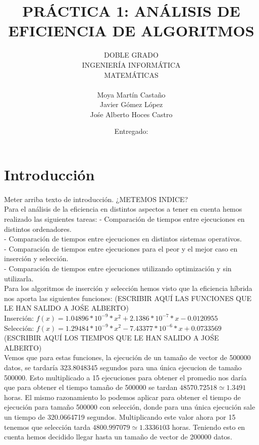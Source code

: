 \documentclass[10pt,a4paper]{article}
\author{DOBLE GRADO\\INGENIERÍA INFORMÁTICA\\MATEMÁTICAS\\\\Moya Martín Castaño\\Javier Gómez López\\Jośe Alberto Hoces Castro}
\title{PRÁCTICA 1: ANÁLISIS DE EFICIENCIA DE ALGORITMOS\\}
\date{Entregado: \newpage }
\begin{document}
\maketitle
\section*{Introducción}

\paragraph{}
Meter arriba texto de introducción.
¿METEMOS INDICE?
\\
Para el análisis de la eficiencia en distintos aspectos a tener en cuenta hemos realizado las siguientes tareas:
	- Comparación de tiempos entre ejecuciones en distintos ordenadores. \\
	- Comparación de tiempos entre ejecuciones en distintos sistemas operativos. \\
	- Comparación de tiempos entre ejecuciones para el peor y el mejor caso en  inserción y selección. \\
	- Comparación de tiempos entre ejecuciones utilizando optimización y sin utilizarla. \\

Para los algoritmos de inserción y selección hemos visto que la eficiencia híbrida nos aporta las siguientes funciones:
(ESCRIBIR AQUÍ LAS FUNCIONES QUE LE HAN SALIDO A JOŚE ALBERTO)
\\
Inserción: $f(x) =  1.04896 * 10^{-9} * x^2 + 2.1386 * 10^{-7} * x - 0.0120955 $
\\
Selección: $f(x) =  1.29484 * 10^{-9} * x^2 - 7.43377 * 10^{-6} * x + 0.0733569 $
\\
(ESCRIBIR AQUÍ LOS TIEMPOS QUE LE HAN SALIDO A JOŚE ALBERTO)
\\
Vemos que para estas funciones, la ejecución de un tamaño de vector de 500000 datos, se tardaría  323.8048345 segundos para una única ejecucion de tamaño 500000. Esto multiplicado a 15 ejecuciones para obtener el promedio nos daría que para obtener el tiempo tamaño de 500000 se tardan $48570.72518 \simeq 1.3491$ horas. El mismo razonamiento lo podemos aplicar para obtener el tiempo de ejecución para tamaño 500000 con selección, donde para una única ejecución sale un tiempo de 320.0664719 segundos. Multiplicando este valor ahora por 15 tenemos que selección tarda $4800.997079 \simeq 1.3336103$ horas. Teniendo esto en cuenta hemos decidido llegar hasta un tamaño de vector de 200000 datos.
\end{document}
